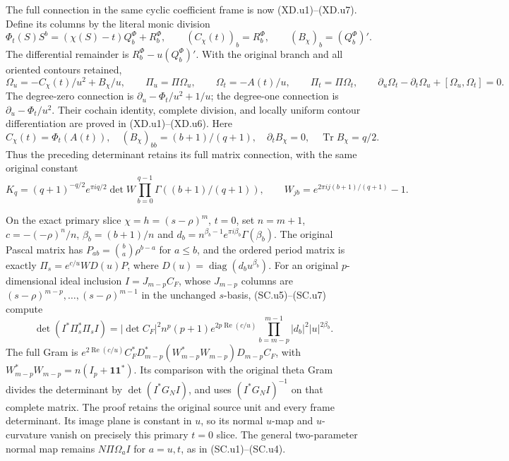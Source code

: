 The full connection in the same cyclic coefficient frame is
now (XD.u1)--(XD.u7).  Define its columns by the literal monic
division
\[
 \Phi_t(S)S^b=(\chi(S)-t)Q_b^\Phi+R_b^\Phi,\qquad
 (C_\chi(t))_b=R_b^\Phi,\qquad (B_\chi)_b=(Q_b^\Phi)' .
\]
The differential remainder is \(R_b^\Phi-u(Q_b^\Phi)'\).
With the original branch and all oriented contours retained,
\[
 \Omega_u=-C_\chi(t)/u^2+B_\chi/u,\qquad
 \Pi_u=\Pi\Omega_u,\qquad
 \Omega_t=-A(t)/u,\qquad \Pi_t=\Pi\Omega_t,
 \qquad
 \partial_u\Omega_t-\partial_t\Omega_u+
                          [\Omega_u,\Omega_t]=0 .
\]
The degree-zero connection is
\(\partial_u-\Phi_t/u^2+1/u\); the degree-one connection is
\(\partial_u-\Phi_t/u^2\).  Their cochain identity, complete
division, and locally uniform contour differentiation are proved
in (XD.u1)--(XD.u6).  Here
\[
 C_\chi(t)=\Phi_t(A(t)),\quad
 (B_\chi)_{bb}=(b+1)/(q+1),\quad
 \partial_tB_\chi=0,\quad \operatorname{Tr}B_\chi=q/2.
\]
Thus the preceding determinant retains its full matrix
connection, with the same original constant
\[
 K_q=(q+1)^{-q/2}e^{\pi iq/2}\det W
          \prod_{b=0}^{q-1}\Gamma((b+1)/(q+1)),\qquad
 W_{jb}=e^{2\pi i j(b+1)/(q+1)}-1.
\]

On the exact primary slice \(\chi=h=(s-\rho)^m\), \(t=0\),
set \(n=m+1\), \(c=-(-\rho)^n/n\),
\(\beta_b=(b+1)/n\) and
\(d_b=n^{\beta_b-1}e^{\pi i\beta_b}\Gamma(\beta_b)\).
The original Pascal matrix has
\(P_{ab}=\binom ba\rho^{b-a}\) for \(a\le b\), and
the ordered period matrix is exactly
\(\Pi_s=e^{c/u}WD(u)P\), where
\(D(u)=\operatorname{diag}(d_bu^{\beta_b})\).
For an original \(p\)-dimensional ideal inclusion
\(I=J_{m-p}C_F\), whose \(J_{m-p}\) columns are
\((s-\rho)^{m-p},\ldots,(s-\rho)^{m-1}\) in the unchanged
\(s\)-basis, (SC.u5)--(SC.u7) compute
\[
 \det(I^*\Pi_s^*\Pi_s I)
 =|\det C_F|^2n^p(p+1)e^{2p\operatorname{Re}(c/u)}
                \prod_{b=m-p}^{m-1}|d_b|^2|u|^{2\beta_b}.
\]
The full Gram is
\(e^{2\operatorname{Re}(c/u)}
C_F^*D_{m-p}^*(W_{m-p}^*W_{m-p})D_{m-p}C_F\), with
\(W_{m-p}^*W_{m-p}=n(I_p+\mathbf1\mathbf1^*)\).
Its comparison with the original theta Gram divides the
determinant by \(\det(I^*G_NI)\), and uses
\((I^*G_NI)^{-1}\) on that complete matrix.
The proof retains the original source unit and every frame
determinant.  Its image plane is constant in \(u\), so its normal
\(u\)-map and \(u\)-curvature vanish on precisely this primary
\(t=0\) slice.  The general two-parameter normal map remains
\(N\Pi\Omega_a I\) for \(a=u,t\), as in (SC.u1)--(SC.u4).

